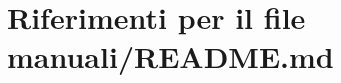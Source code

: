\hypertarget{manuali_2README_8md}{}\section{Riferimenti per il file manuali/\+R\+E\+A\+D\+ME.md}
\label{manuali_2README_8md}
